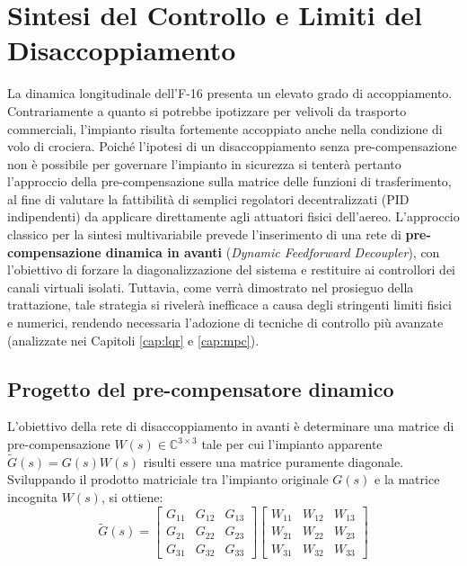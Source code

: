 
\chapter{Sintesi del Controllo e Limiti del Disaccoppiamento}
\label{cap:9}
La dinamica longitudinale dell'F-16 presenta un elevato grado di accoppiamento. Contrariamente a quanto si potrebbe ipotizzare per velivoli da trasporto commerciali, l'impianto risulta fortemente accoppiato anche nella condizione di volo di crociera. Poiché l'ipotesi di un disaccoppiamento senza pre-compensazione non è possibile per  governare l'impianto in sicurezza si tenterà pertanto l'approccio della pre-compensazione sulla matrice delle funzioni di trasferimento, al fine di valutare la fattibilità di semplici regolatori decentralizzati (PID indipendenti) da applicare direttamente agli attuatori fisici dell'aereo. L'approccio classico per la sintesi multivariabile prevede l'inserimento di una rete di \textbf{pre-compensazione dinamica in avanti} (\textit{Dynamic Feedforward Decoupler}), con l'obiettivo di forzare la diagonalizzazione del sistema e restituire ai controllori dei canali virtuali isolati. Tuttavia, come verrà dimostrato nel prosieguo della trattazione, tale strategia si rivelerà inefficace a causa degli stringenti limiti fisici e numerici, rendendo necessaria l'adozione di tecniche di controllo più avanzate (analizzate nei Capitoli \ref{cap:lqr} e \ref{cap:mpc}).

\section{Progetto del pre-compensatore dinamico}

L'obiettivo della rete di disaccoppiamento in avanti è determinare una matrice di pre-compensazione $W(s) \in \mathbb{C}^{3 \times 3}$ tale per cui l'impianto apparente $\tilde{G}(s) = G(s)W(s)$ risulti essere una matrice puramente diagonale.
Sviluppando il prodotto matriciale tra l'impianto originale $G(s)$ e la matrice incognita $W(s)$, si ottiene:
\begin{equation}
	\tilde{G}(s) = 
	\begin{bmatrix}
		G_{11} & G_{12} & G_{13} \\ 
		G_{21} & G_{22} & G_{23} \\ 
		G_{31} & G_{32} & G_{33}
	\end{bmatrix}
	\begin{bmatrix}
		W_{11} & W_{12} & W_{13} \\ 
		W_{21} & W_{22} & W_{23} \\ 
		W_{31} & W_{32} & W_{33}
	\end{bmatrix}
\end{equation}

